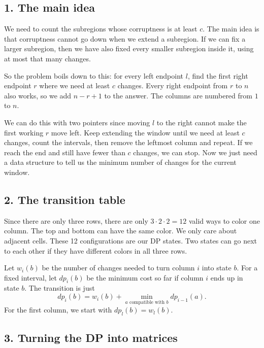 \documentclass[11pt,a4paper]{article}
\begin{document}

\subsection*{1. The main idea}

We need to count the subregions whose corruptness is at least $c$.
The main idea is that corruptness cannot go down when we extend a
subregion. If we can fix a larger subregion, then we have also fixed
every smaller subregion inside it, using at most that many changes.

So the problem boils down to this: for every left endpoint $l$, find the
first right endpoint $r$ where we need at least $c$ changes. Every right
endpoint from $r$ to $n$ also works, so we add $n-r+1$ to the answer.
The columns are numbered from $1$ to $n$.

We can do this with two pointers since moving $l$ to the right cannot
make the first working $r$ move left. Keep extending the window until
we need at least $c$ changes, count the intervals, then remove the leftmost
column and repeat. If we reach the end and still have fewer than $c$
changes, we can stop. Now we just need a data structure to tell us the
minimum number of changes for the current window.

\subsection*{2. The transition table}
Since there are only three rows, there are only $3\cdot2\cdot2=12$
valid ways to color one column. The top and bottom can have the same
color. We only care about adjacent cells. These 12 configurations are
our DP states. Two states can go next to each other if they have
different colors in all three rows.

Let $w_i(b)$ be the number of changes needed to turn column $i$ into
state $b$. For a fixed interval, let $dp_i(b)$ be the minimum cost so far
if column $i$ ends up in state $b$. The transition is just
\[
  dp_i(b)=w_i(b)+\min_{a\text{ compatible with }b}dp_{i-1}(a).
\]
For the first column, we start with $dp_l(b)=w_l(b)$.

\subsection*{3. Turning the DP into matrices}
\end{document}
